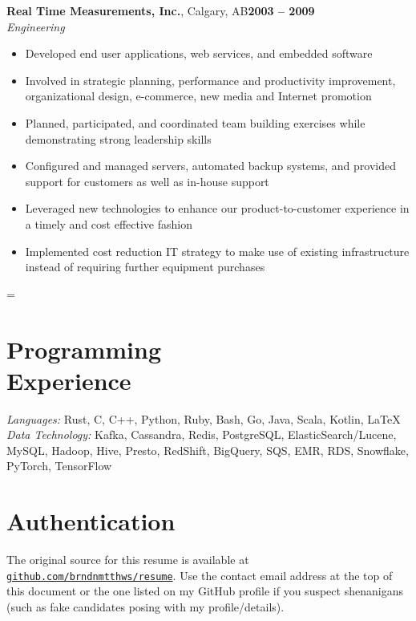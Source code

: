 \documentclass[margin,line]{resume}
\newenvironment{absolutelynopagebreak}
  {\par\nobreak\vfil\penalty0\vfilneg
   \vtop\bgroup}
  {\par\xdef\tpd{\the\prevdepth}\egroup
   \prevdepth=\tpd}
\begin{document}
\begin{resume}
    \vspace{5mm}

    \begin{absolutelynopagebreak}
    \textbf{Real Time Measurements, Inc.}, Calgary, AB\hfill \textbf{2003 -- 2009}\vspace{2mm}\\\vspace{1mm}%
    \textsl{Engineering}

    \begin{itemize}
        \item Developed end user applications, web services, and embedded
        software
        \item Involved in strategic planning, performance and productivity
        improvement, organizational design, e-commerce, new media and Internet
        promotion
        \item Planned, participated, and coordinated team building exercises
        while demonstrating strong leadership skills
        \item Configured and managed servers, automated backup systems, and
        provided support for customers as well as in-house support
        \item Leveraged new technologies to enhance our product-to-customer
        experience in a timely and cost effective fashion
        \item Implemented cost reduction IT strategy to make use of existing
        infrastructure instead of requiring further equipment purchases
    \end{itemize}
    \end{absolutelynopagebreak}

    \vspace{3mm}
    
    \section{\mysidestyle Programming\\Experience}

    \emph{Languages:} Rust, C, C++, Python, Ruby, Bash, Go, Java, Scala, Kotlin, \LaTeX \\
    \emph{Data Technology:} Kafka, Cassandra, Redis, PostgreSQL, ElasticSearch/Lucene,
     MySQL, Hadoop, Hive, Presto, RedShift, BigQuery, SQS, EMR, RDS, Snowflake,
     PyTorch, TensorFlow

    \section{\mysidestyle Authentication}

    The original source for this resume is available at
    \href{https://github.com/brndnmtthws/resume}{\texttt{github.com/brndnmtthws/resume}}.
    Use the contact email address at the top of this document or the one listed
    on my GitHub profile if you suspect shenanigans (such as fake candidates
    posing with my profile/details).
\end{resume}
\end{document}
